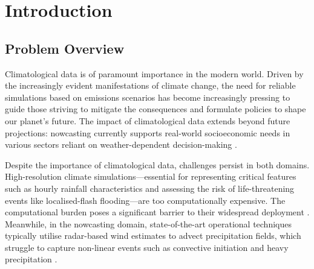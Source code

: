 \documentclass[ oneside,%
                    author={George Herbert},
                    degree={MSci},
                     title={Diffusion Models for Time-Evolving Precipitation Fields},
                  subtitle={}]{dissertation}
\begin{document}
%

\mainmatter


\chapter{Introduction}
\label{chap:introduction}

\section{Problem Overview}

Climatological data is of paramount importance in the modern world. Driven by the increasingly evident manifestations of climate change, the need for reliable simulations based on emissions scenarios has become increasingly pressing to guide those striving to mitigate the consequences and formulate policies to shape our planet's future. The impact of climatological data extends beyond future projections: nowcasting currently supports real-world socioeconomic needs in various sectors reliant on weather-dependent decision-making \cite{Wilson_Nowcasting_Challenges}.

Despite the importance of climatological data, challenges persist in both domains. High-resolution climate simulations---essential for representing critical features such as hourly rainfall characteristics and assessing the risk of life-threatening events like localised-flash flooding---are too computationally expensive. The computational burden poses a significant barrier to their widespread deployment \cite{MO_CPM}. Meanwhile, in the nowcasting domain, state-of-the-art operational techniques typically utilise radar-based wind estimates to advect precipitation fields, which struggle to capture non-linear events such as convective initiation and heavy precipitation \cite{Ravuri_Skillful_Precipitation_Nowcasting}.
\end{document}
